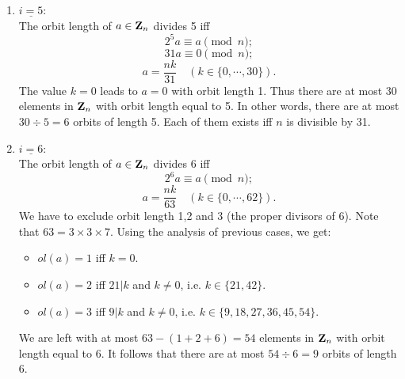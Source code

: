 {\begin{enumerate}
      \item $\underline{ i=5} $:\\ 
	    The orbit length of $ a \in {\bf Z}_{n} $ divides 5 iff\\
	    $$ 2^5a \equiv a \pmod {n} ;$$
	    $$ 31a \equiv 0 \pmod {n} ;$$                                
	    $$ a=\frac{nk}{31} \quad (k \in \{0,\cdots,30\}). $$
	    The value $ k=0 $ leads to $a=0$ with orbit length 1. 
	    Thus there are at most 30 elements in $ {\bf Z}_{n} $ 
	    with orbit length equal to 5. In other words, there are at most 
	    $ 30 \div 5=6 $ orbits of length 5. 
	    Each of them exists iff $n$ is divisible by 31.
      \item $ \underline{i=6} $:\\ 
	    The orbit length of $ a \in {\bf Z}_{n} $ divides 6 iff
	    $$ 2^6a \equiv a \pmod {n} ;$$
	    $$ a=\frac{nk}{63} \quad (k \in \{0,\cdots,62\}). $$ 
	    We have to exclude orbit length 1,2 and 3 (the proper divisors of 6).  
	    Note that $63=3 \times 3 \times 7$. Using the analysis of previous 
	    cases, we get: 

    \begin{itemize}
	\item $ ol(a)=1 $ iff $ k=0 $.
	\item $ ol(a)=2 $ iff $ 21 | k $ and $k \neq 0$, i.e. $k \in \{21,42\}$. 
	\item $ ol(a)=3 $ iff $ 9 | k $ and $k \neq 0$, i.e. $k \in \{9,18,27,36,45,54\}$. 
     \end{itemize}

	We are left with at most $ 63-(1+2+6)=54 $ elements in $ {\bf Z}_{n} $ with orbit length equal to 6. 
	It follows that there are at most $54 \div 6=9$ orbits of length 6.
%


\end{enumerate}}
